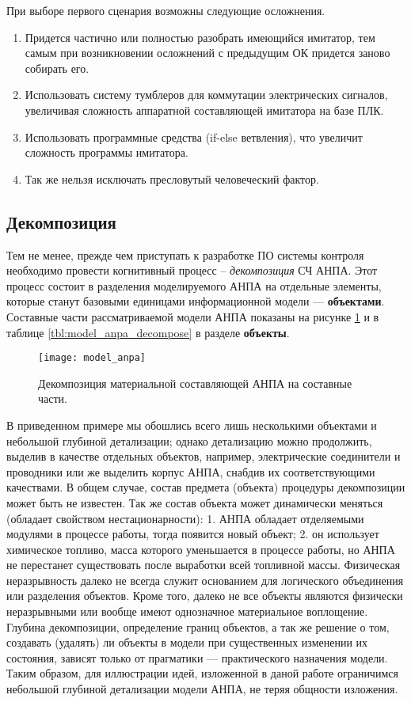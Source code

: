 При выборе первого сценария возможны следующие осложнения.
\begin{enumerate}
    \item Придется частично или полностью разобрать имеющийся имитатор, тем самым при возникновении 
        осложнений с предыдущим ОК придется заново собирать его.
    \item Использовать систему тумблеров для коммутации электрических сигналов,
        увеличивая сложность аппаратной составляющей имитатора на базе ПЛК.
    \item Использовать программные средства (if-else ветвления), что увеличит сложность программы имитатора.
    \item Так же нельзя исключать пресловутый человеческий фактор.
\end{enumerate}


\subsection{Декомпозиция}

Тем не менее, прежде чем приступать к разработке ПО системы контроля необходимо провести когнитивный процесс -- \textit{декомпозиция} СЧ АНПА.
Этот процесс состоит в разделения моделируемого АНПА на отдельные элементы, которые станут базовыми единицами информационной модели --- \textbf{объектами}.
Составные части рассматриваемой модели АНПА показаны на рисунке \ref{fig:model_anpa} и в таблице \ref{tbl:model_anpa_decompose} в разделе \textbf{объекты}.
\begin{center}
    \begin{figure}[hb!]
        \texttt{[image: model\_anpa]}
        \caption{Декомпозиция материальной составляющей АНПА на составные части.}
            \label{fig:model_anpa}
    \end{figure}
\end{center}
В приведенном примере мы обошлись всего лишь несколькими объектами и небольшой глубиной детализации;
однако детализацию можно продолжить, выделив в качестве отдельных объектов, например, электрические соединители и проводники
или же выделить корпус АНПА, снабдив их соответствующими качествами.
В общем случае, состав предмета (объекта) процедуры декомпозиции может быть не известен.
Так же состав объекта может динамически меняться (обладает свойством нестационарности):
1. АНПА обладает отделяемыми модулями в процессе работы, тогда появится новый объект;
2. он использует химическое топливо, масса которого уменьшается в процессе работы,
   но АНПА не перестанет существовать после выработки всей топливной массы.
Физическая неразрывность далеко не всегда служит основанием для логического объединения или разделения объектов.
Кроме того, далеко не все объекты являются физически неразрывными или вообще имеют однозначное материальное воплощение.
%
Глубина декомпозиции, определение границ объектов, а так же решение о том, создавать (удалять) ли объекты в модели
при существенных изменении их состояния, зависят только от прагматики --- практического назначения модели.
Таким образом, для иллюстрации идей, изложенной в даной работе ограничимся небольшой глубиной детализации модели АНПА,
не теряя общности изложения.



